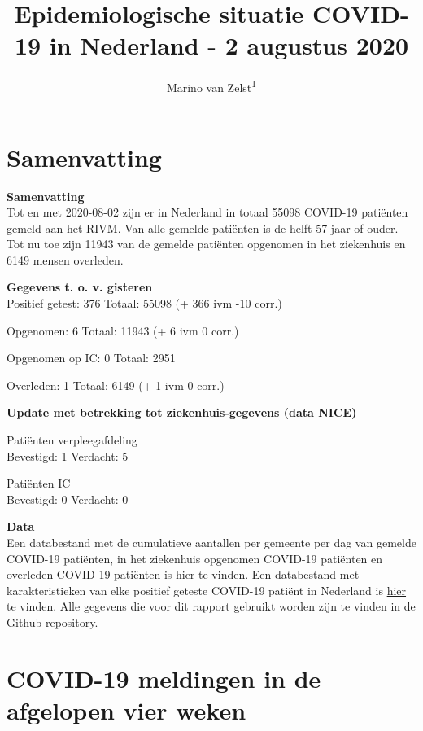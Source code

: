 \documentclass[
  english,
  man,floatsintext]{apa6}
\title{Epidemiologische situatie COVID-19 in Nederland - 2 augustus 2020}
\author{Marino van Zelst\textsuperscript{1}}
\date{}
\affiliation{\vspace{0.5cm}\textsuperscript{1} -}
\begin{document}
\maketitle

{
\hypersetup{linkcolor=}
\setcounter{tocdepth}{3}
\tableofcontents
}
\newpage

\hypertarget{samenvatting}{%
\section{Samenvatting}\label{samenvatting}}

\textbf{Samenvatting}\\
Tot en met 2020-08-02 zijn er in Nederland in totaal 55098 COVID-19 patiënten gemeld aan het RIVM. Van alle gemelde patiënten is de helft 57 jaar of ouder. Tot nu toe zijn 11943 van de gemelde patiënten opgenomen in het ziekenhuis en 6149 mensen overleden.

\textbf{Gegevens t. o. v. gisteren}\\
Positief getest: 376
Totaal: 55098 (+ 366 ivm -10 corr.)

Opgenomen: 6
Totaal: 11943 (+
6 ivm 0 corr.)

Opgenomen op IC: 0
Totaal: 2951

Overleden: 1
Totaal: 6149 (+
1 ivm 0 corr.)

\textbf{Update met betrekking tot ziekenhuis-gegevens (data NICE)}

Patiënten verpleegafdeling\\
Bevestigd: 1 Verdacht: 5

Patiënten IC\\
Bevestigd: 0 Verdacht: 0

\textbf{Data}\\
Een databestand met de cumulatieve aantallen per gemeente per dag van gemelde COVID-19 patiënten, in het ziekenhuis opgenomen COVID-19 patiënten en overleden COVID-19 patiënten is \href{https://data.rivm.nl/geonetwork/srv/dut/catalog.search\#/metadata/1c0fcd57-1102-4620-9cfa-441e93ea5604}{hier} te vinden. Een databestand met karakteristieken van elke positief geteste COVID-19 patiënt in Nederland is \href{https://data.rivm.nl/geonetwork/srv/dut/catalog.search\#/metadata/2c4357c8-76e4-4662-9574-1deb8a73f724?tab=relations}{hier} te vinden. Alle gegevens die voor dit rapport gebruikt worden zijn te vinden in de \href{https://github.com/mzelst/covid-19}{Github repository}.

\newpage

\hypertarget{covid-19-meldingen-in-de-afgelopen-vier-weken}{%
\section{COVID-19 meldingen in de afgelopen vier weken}\label{covid-19-meldingen-in-de-afgelopen-vier-weken}}
\end{document}

